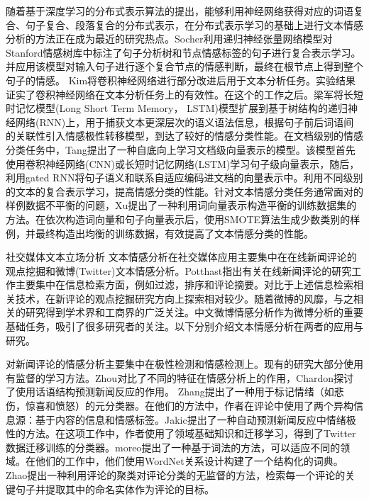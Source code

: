 随着基于深度学习的分布式表示算法的提出，能够利用神经网络获得对应的词语复合、句子复合、段落复合的分布式表示，在分布式表示学习的基础上进行文本情感分析的方法正在成为最近的研究热点。Socher\cite{socher2013recursive}利用递归神经张量网络模型对Stanford情感树库中标注了句子分析树和节点情感标签的句子进行复合表示学习。并应用该模型对输入句子进行逐个复合节点的情感判断，最终在根节点上得到整个句子的情感。 Kim\cite{kim2014convolutional}将卷积神经网络进行部分改进后用于文本分析任务。实验结果证实了卷积神经网络在文本分析任务上的有效性。在这个的工作之后。梁军\cite{梁2015基于极性转移和}将长短时记忆模型(Long Short Term Memory， LSTM)模型扩展到基于树结构的递归神经网络(RNN)上，用于捕获文本更深层次的语义语法信息，根据句子前后词语间的关联性引入情感极性转移模型，到达了较好的情感分类性能。在文档级别的情感分类任务中，Tang\cite{tang2015deep}提出了一种自底向上学习文档级向量表示的模型。该模型首先使用卷积神经网络(CNN)或长短时记忆网络(LSTM)学习句子级向量表示，随后，利用gated RNN将句子语义和联系自适应编码进文档的向量表示中。利用不同级别的文本的复合表示学习，提高情感分类的性能。针对文本情感分类任务通常面对的样例数据不平衡的问题，Xu\cite{xu2015show}提出了一种利用词向量表示构造平衡的训练数据集的方法。在依次构造词向量和句子向量表示后，使用SMOTE算法生成少数类别的样例，并最终构造出均衡的训练数据，有效提高了文本情感分类的性能。

社交媒体文本立场分析
文本情感分析在社交媒体应用主要集中在在线新闻评论的观点挖掘和微博(Twitter)文本情感分析。Potthast\cite{potthast2012information}指出有关在线新闻评论的研究工作主要集中在信息检索方面，例如过滤，排序和评论摘要。对比于上述信息检索相关技术，在新评论的观点挖掘研究方向上探索相对较少。随着微博的风靡，与之相关的研究得到学术界和工商界的广泛关注。中文微博情感分析作为微博分析的重要基础任务，吸引了很多研究者的关注。以下分别介绍文本情感分析在两者的应用与研究。

对新闻评论的情感分析主要集中在极性检测和情感检测上。现有的研究大部分使用有监督的学习方法。Zhou\cite{zhou2010research}对比了不同的特征在情感分析上的作用，Chardon\cite{chardon2013measuring}探讨了使用话语结构预测新闻反应的作用。 Zhang\cite{zhang2016ecnu}提出了一种用于标记情绪（如悲伤，惊喜和愤怒）的元分类器。在他们的方法中，作者在评论中使用了两个异构信息源：基于内容的信息和情感标签。Jakic提出了一种自动预测新闻反应中情绪极性的方法。在这项工作中，作者使用了领域基础知识和迁移学习，得到了Twitter数据迁移训练的分类器。moreo\cite{moreo2012lexicon}提出了一种基于词法的方法，可以适应不同的领域。在他们的工作中，他们使用WordNet关系设计构建了一个结构化的词典。 Zhao\cite{zhao2010jointly}提出一种利用评论的聚类对评论分类的无监督的方法，检索每一个评论的关键句子并提取其中的命名实体作为评论的目标。

